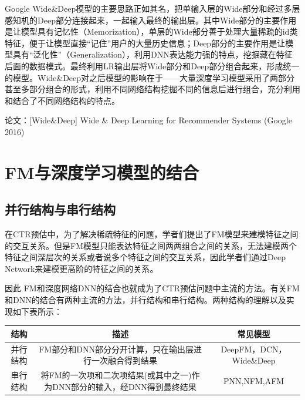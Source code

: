 \documentclass[12pt]{article}
\begin{document}
Google Wide\&Deep模型的主要思路正如其名，把单输入层的Wide部分和经过多层感知机的Deep部分连接起来，一起输入最终的输出层。其中Wide部分的主要作用是让模型具有记忆性（Memorization），单层的Wide部分善于处理大量稀疏的id类特征，便于让模型直接“记住”用户的大量历史信息；Deep部分的主要作用是让模型具有“泛化性”（Generalization），利用DNN表达能力强的特点，挖掘藏在特征后面的数据模式。最终利用LR输出层将Wide部分和Deep部分组合起来，形成统一的模型。Wide\&Deep对之后模型的影响在于——大量深度学习模型采用了两部分甚至多部分组合的形式，利用不同网络结构挖掘不同的信息后进行组合，充分利用和结合了不同网络结构的特点。

论文：[Wide\&Deep] Wide \& Deep Learning for Recommender Systems (Google 2016)

\section{FM与深度学习模型的结合}
\subsection{并行结构与串行结构}
在CTR预估中，为了解决稀疏特征的问题，学者们提出了FM模型来建模特征之间的交互关系。但是FM模型只能表达特征之间两两组合之间的关系，无法建模两个特征之间深层次的关系或者说多个特征之间的交互关系，因此学者们通过Deep Network来建模更高阶的特征之间的关系\cite{Recommender_System_With_Deep_Learning_NFM}。

因此 FM和深度网络DNN的结合也就成为了CTR预估问题中主流的方法。有关FM和DNN的结合有两种主流的方法，并行结构和串行结构。两种结构的理解以及实现如下表所示：

\begin{table}[H]
    \centering
    \begin{tabular}{|c|c|c|}
    \hline 
       \textbf{结构}	    & \textbf{描述}	  & \textbf{常见模型} \\ \hline
       并行结构  & FM部分和DNN部分分开计算，只在输出层进行一次融合得到结果	& DeepFM，DCN，Wide\&Deep \\ \hline
       串行结构	& 将FM的一次项和二次项结果(或其中之一)作为DNN部分的输入，经DNN得到最终结果	 & PNN,NFM,AFM \\ \hline
    \end{tabular}
\end{table}
\end{document}
